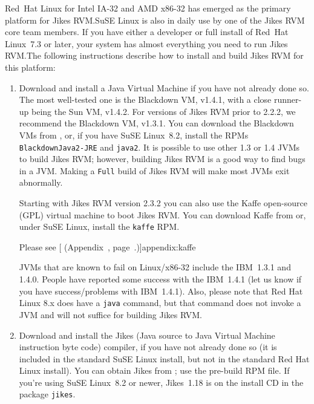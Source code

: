 Red~Hat\TMboth{} Linux\Rboth{} for Intel\Rboth{} IA-32 and AMD\Rboth{} x86-32 has emerged as the 
primary platform for Jikes\TMweb{} RVM.\@  SuSE\Rboth{} Linux is also in daily use
by one of the Jikes RVM core team members.
If you have either a developer or full install of Red~Hat
Linux~7.3 or later, your system has almost everything you need
to run Jikes RVM.\@  The following instructions describe how to install
and build Jikes RVM for this platform:
\begin{enumerate}

%
%
%
\item Download and install a Java\TMweb{} Virtual Machine if you have not
already done so.  The most well-tested one is the Blackdown VM,
v1.4.1, with a close runner-up being the Sun VM, v1.4.2.
For versions of Jikes RVM prior to 2.2.2, we recommend
the Blackdown VM, v1.3.1.  You can download the Blackdown VMs from 
\xlink{{\tt \BlackdownURL}}{\BlackdownURL}, or, if you have SuSE
Linux~8.2, install the RPMs {\tt Black\-downJa\-va2-JRE} and {\tt java2}. 
It is possible to use other 1.3 or 1.4 JVMs to build Jikes RVM;
however, building Jikes RVM is a good way to find bugs in a JVM.\@
Making a {\tt Full} build of Jikes RVM will make most JVMs exit abnormally.

%
Starting with Jikes RVM version 2.3.2 you can also use the Kaffe
open-source (GPL) virtual machine to boot Jikes RVM.  You can download
Kaffe from \xlink{{\tt \KaffeURL}}{\KaffeURL} or, under SuSE Linux, install the 
{\tt kaffe} RPM.

Please see 
[ (Appendix~\Ref, page~\Pageref.)]{appendix:kaffe}


%
JVMs that are known to fail on Linux/x86-32 include the IBM\Rweb{}~1.3.1 and
1.4.0.  People have reported some success with the IBM~1.4.1 (let us
know if you have success/problems with IBM~1.4.1). Also, please note
that Red Hat Linux 8.x does have a {\tt java} command, but that command does not invoke a
JVM and will not suffice for building Jikes RVM.\@

%
\item Download and install the Jikes (Java source to Java Virtual
  Machine instruction byte code)
compiler, if you have not already 
done so (it is included in the standard SuSE Linux install, but not in
the standard Red Hat Linux install).  You can 
obtain Jikes from ;
use the pre-build RPM file.
If you're using SuSE Linux~8.2 or newer, Jikes~1.18 is on the install
CD in the package {\tt jikes}.


\end{enumerate}
